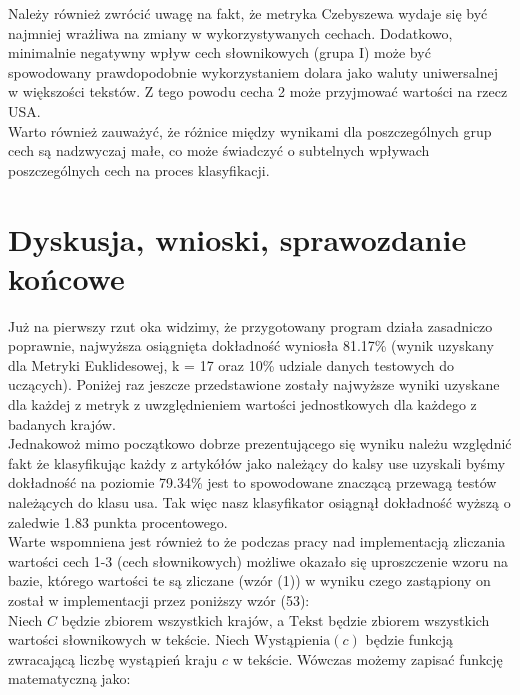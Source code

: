\documentclass{article}
\begin{document}
\noindent Należy również zwrócić uwagę na fakt, że metryka Czebyszewa wydaje się być najmniej wrażliwa na zmiany w wykorzystywanych cechach. Dodatkowo, minimalnie negatywny wpływ cech słownikowych (grupa I) może być spowodowany prawdopodobnie wykorzystaniem dolara jako waluty uniwersalnej w większości tekstów. Z tego powodu cecha 2 może przyjmować wartości na rzecz USA. \\

\noindent Warto również zauważyć, że różnice między wynikami dla poszczególnych grup cech są nadzwyczaj małe, co może świadczyć o subtelnych wpływach poszczególnych cech na proces klasyfikacji. \\





\section{Dyskusja, wnioski, sprawozdanie końcowe}

Już na pierwszy rzut oka widzimy, że przygotowany program działa zasadniczo poprawnie, najwyższa osiągnięta dokładność wyniosła 81.17\% (wynik uzyskany dla Metryki Euklidesowej, k = 17 oraz 10\% udziale danych testowych do uczących). Poniżej raz jeszcze przedstawione zostały najwyższe wyniki uzyskane dla każdej z metryk z uwzględnieniem wartości jednostkowych dla każdego z badanych krajów. \\



\noindent Jednakowoż mimo początkowo dobrze prezentującego się wyniku należu względnić fakt że klasyfikując każdy z artykółów jako należący do kalsy use uzyskali byśmy dokładność na poziomie 79.34\% jest to spowodowane znaczącą przewagą testów należących do klasu usa. Tak więc nasz klasyfikator osiągnął dokładność wyższą o zaledwie 1.83 punkta procentowego. \\

\noindent Warte wspomniena jest również to że podczas pracy nad implementacją zliczania wartości cech 1-3 (cech słownikowych) możliwe okazało się uproszczenie wzoru na bazie, którego wartości te są zliczane (wzór (1)) w wyniku czego zastąpiony on został w implementacji przez poniższy wzór (53): \\

Niech $C$ będzie zbiorem wszystkich krajów, a $\text{Tekst}$ będzie zbiorem wszystkich wartości słownikowych w tekście. Niech $\text{Wystąpienia}(c)$ będzie funkcją zwracającą liczbę wystąpień kraju $c$ w tekście. Wówczas możemy zapisać funkcję matematyczną jako:
\end{document}
